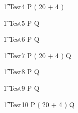 
\begin{circus}
   \t1 Test4 \circdef  P \circendby ( 20 + 4 )  \\
\end{circus}



\begin{circus}
   \t1 Test5 \circdef  P \circtimeout Q  \\
\end{circus}



\begin{circus}
   \t1 Test6 \circdef  P  Q  \\
\end{circus}


\begin{circus}
   \t1 Test7 \circdef  P \circtimeout  ( 20 + 4 ) Q  \\
\end{circus}


\begin{circus}
   \t1 Test8 \circdef  P \circtimedinterrupt Q  \\
\end{circus}



\begin{circus}
   \t1 Test9 \circdef  P  Q  \\
\end{circus}


\begin{circus}
   \t1 Test10 \circdef  P \circtimedinterrupt  ( 20 + 4 ) Q  \\
\end{circus}

